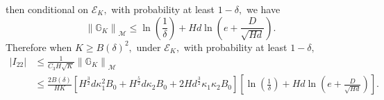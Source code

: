 \documentclass{article}
\numberwithin{equation}{section}
\theoremstyle{plain}
\theoremstyle{definition}
\theoremstyle{remark}
\begin{document}
then conditional on $\mathcal{E}_K,$ with probability at least $1-\delta,$ we have
\begin{equation*}
    \left\|\mathbb{G}_K\right\|_{\mathcal{M}} \leq \ln\left(\frac{1}{\delta}\right) + Hd \ln\left(e + \frac{D}{\sqrt{Hd}}\right).
\end{equation*}
Therefore when $K \geq B(\delta)^2,$ under $\mathcal{E}_K,$ with probability at least $1-\delta,$
\begin{align*}
    \left|I_{22}\right|
    & \leq \frac{1}{C_3 H \sqrt{K}}\left\|\mathbb{G}_K\right\|_{\mathcal{M}} \\
    & \leq \frac{2 B(\delta)}{H K} \left[H^{\frac{3}{2}} d \kappa_{1}^{2} B_{0}+H^{\frac{5}{2}} d \kappa_{2} B_{0}+2 H d^{\frac{3}{2}} \kappa_{1} \kappa_{2} B_{0}\right] \left[\ln\left(\frac{1}{\delta}\right) + Hd \ln\left(e + \frac{D}{\sqrt{Hd}}\right)\right].
\end{align*}
\end{document}
